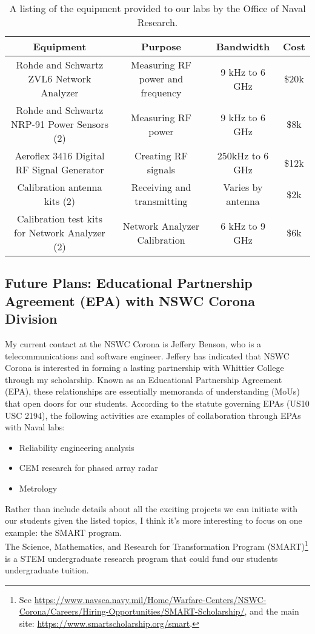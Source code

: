 \documentclass[../../../main.tex]{subfiles}
\begin{document}
\begin{table}
\centering
\begin{tabular}{c c c c}
Equipment & Purpose & Bandwidth & Cost \\ \hline
Rohde and Schwartz ZVL6 Network Analyzer & Measuring RF power and frequency & 9 kHz to 6 GHz & \$20k \\
Rohde and Schwartz NRP-91 Power Sensors (2) & Measuring RF power & 9 kHz to 6 GHz & \$8k \\
Aeroflex 3416 Digital RF Signal Generator & Creating RF signals & 250kHz to 6 GHz & \$12k \\
Calibration antenna kits (2) & Receiving and transmitting & Varies by antenna & \$2k \\
Calibration test kits for Network Analyzer (2) & Network Analyzer Calibration & 6 kHz to 9 GHz & \$6k
\end{tabular}
\caption{\label{tab:equip} A listing of the equipment provided to our labs by the Office of Naval Research.}
\end{table}

\subsection{Future Plans: Educational Partnership Agreement (EPA) with NSWC Corona Division}
\label{sec:epa}

My current contact at the NSWC Corona is Jeffery Benson, who is a telecommunications and software engineer.  Jeffery has indicated that NSWC Corona is interested in forming a lasting partnership with Whittier College through my scholarship.  Known as an Educational Partnership Agreement (EPA), these relationships are essentially memoranda of understanding (MoUs) that open doors for our students.  According to the statute governing EPAs (US10 USC 2194), the following activities are examples of collaboration through EPAs with Naval labs:

\begin{itemize}
\item Reliability engineering analysis
\item CEM research for phased array radar
\item Metrology
\end{itemize}

Rather than include details about all the exciting projects we can initiate with our students given the listed topics, I think it's more interesting to focus on one example: the SMART program.
\\
\vspace{0.25cm}
The Science, Mathematics, and Research for Transformation Program (SMART)\footnote{See \url{https://www.navsea.navy.mil/Home/Warfare-Centers/NSWC-Corona/Careers/Hiring-Opportunities/SMART-Scholarship/}, and the main site: \url{https://www.smartscholarship.org/smart}.} is a STEM undergraduate research program that could fund our students undergraduate tuition.
\end{document}
